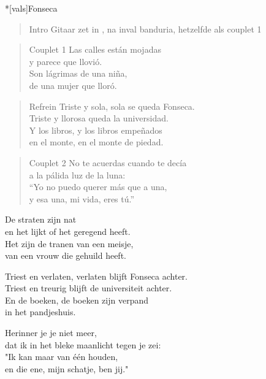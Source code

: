 \begin{song}*[vals]{Fonseca}

\begin{verse}{Intro}
Gitaar zet in , na inval banduria, hetzelfde als couplet 1
\end{verse}
\begin{verse}{Couplet 1}
Las calles están mojadas\\
y parece que llovió.\\
Son lágrimas de una niña,\chord{}\\
de una mujer que lloró.\\
\end{verse}

\begin{verse}{Refrein}
Triste y sola, sola se queda Fonseca.\\
Triste y llorosa queda la universidad.\\
Y los libros, y los libros empeñados\\
en el monte, en el monte de piedad.\\
\end{verse}

\begin{verse}{Couplet 2}
No te acuerdas cuando te decía\\
a la pálida luz de la luna:\\
``Yo no puedo querer más que a una,\chord{}\\
y esa una, mi vida, eres tú.''\\
\end{verse}

\end{song}
\begin{translation}
De straten zijn nat\\
en het lijkt of het geregend heeft.\\
Het zijn de tranen van een meisje,\\
van een vrouw die gehuild heeft.\vspace{\wlskip}

Triest en verlaten, verlaten blijft Fonseca achter.\\
Triest en treurig blijft de universiteit achter.\\
En de boeken, de boeken zijn verpand\\
in het pandjeshuis.\vspace{\wlskip}

Herinner je je niet meer,\\
dat ik in het bleke maanlicht tegen je zei:\\
"\hspace{0.1em}Ik kan maar van één houden,\\
en die ene, mijn schatje, ben jij."\\
\end{translation}
